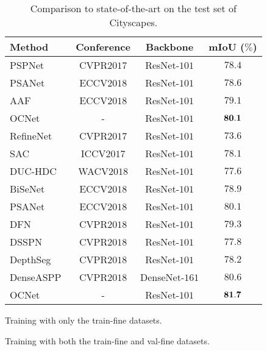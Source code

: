 \documentclass[10pt,twocolumn,letterpaper]{article}
\begin{document}
\begin{table}[ht!]
\centering
\footnotesize
\begin{threeparttable}
\caption{\small{Comparison to state-of-the-art on the test set of Cityscapes.}}
\begin{tabular}{l|c|c|c} \hline
Method & Conference & Backbone & mIoU ($\%$)  \\
\hline 
PSPNet~\cite{zhao2017pyramid}\tnote{\textdagger}  &  CVPR$2017$  & ResNet-$101$  &  $78.4$ \\ 
PSANet~\cite{psanet}\tnote{\textdagger} &  ECCV$2018$  & ResNet-$101$  &  $78.6$ \\ 
AAF~\cite{aaf2018}\tnote{\textdagger}  &  ECCV$2018$  & ResNet-$101$  &  \underline{$79.1$} \\ 
OCNet\tnote{\textdagger} & - &  ResNet-$101$ & $\bf{80.1}$ \\  \hline 
RefineNet~\cite{lin2017refinenet}\tnote{\textdaggerdbl} &  CVPR$2017$  & ResNet-$101$  &  $73.6$ \\ 
SAC~\cite{Zhang_2017_ICCV}\tnote{\textdaggerdbl}  &  ICCV$2017$  & ResNet-$101$  &  $78.1$ \\ 
DUC-HDC~\cite{wang2018understanding}\tnote{\textdaggerdbl} & WACV$2018$ & ResNet-$101$ & $77.6$ \\ 
BiSeNet~\cite{yu2018bisenet}\tnote{\textdaggerdbl} &  ECCV$2018$  & ResNet-$101$  &  $78.9$ \\ 
PSANet~\cite{psanet}\tnote{\textdaggerdbl} &  ECCV$2018$  & ResNet-$101$  &  $80.1$ \\ 
DFN~\cite{Yu_2018_CVPR}\tnote{\textdaggerdbl} &  CVPR$2018$  & ResNet-$101$  &  $79.3$ \\ 
DSSPN~\cite{Liang_2018_CVPR}\tnote{\textdaggerdbl}  &  CVPR$2018$  & ResNet-$101$  & $77.8$  \\ 
DepthSeg~\cite{Kong_2018_CVPR}\tnote{\textdaggerdbl} &  CVPR$2018$  & ResNet-$101$  &  $78.2$ \\ 
DenseASPP~\cite{Yang_2018_CVPR}\tnote{\textdaggerdbl}  &  CVPR$2018$  & DenseNet-$161$  &  \underline{$80.6$} \\ 
OCNet\tnote{\textdaggerdbl} & - &  ResNet-$101$ & $\bf{81.7}$ \\
\hline 
\end{tabular}
\begin{tablenotes}
\item[\textdagger] Training with only the train-fine datasets.
\item[\textdaggerdbl] Training with both the train-fine and val-fine datasets.
\end{tablenotes}
\label{table:ocnet_sota_exp_cityscapes}
\end{threeparttable}
\end{table}
\end{document}
